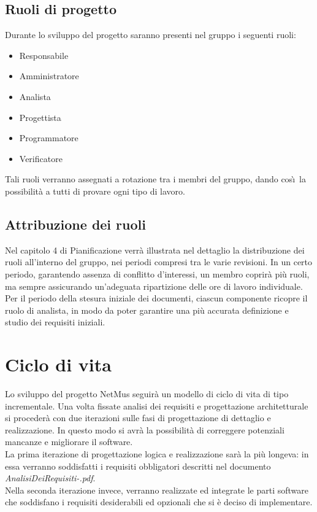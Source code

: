 \section{Ruoli di progetto}
Durante lo sviluppo del progetto saranno presenti nel gruppo i seguenti ruoli:
\begin{itemize}
  \item Responsabile
  \item Amministratore
  \item Analista
  \item Progettista
  \item Programmatore
  \item Verificatore
\end{itemize}

Tali ruoli verranno assegnati a rotazione tra i membri del gruppo, dando
cos\`\i\ la possibilit\`a a tutti di provare ogni tipo di lavoro.

\section{Attribuzione dei ruoli}
Nel capitolo 4 di Pianificazione verr\`a illustrata nel dettaglio la distribuzione dei ruoli
all'interno del gruppo, nei periodi compresi tra le varie revisioni.
In un certo periodo, garantendo assenza di conflitto d'interessi, un membro
coprir\`a pi\`u ruoli, ma sempre assicurando un'adeguata ripartizione delle ore
di lavoro individuale.\\

Per il periodo della stesura iniziale dei documenti, ciascun
componente ricopre il ruolo di analista, in modo da poter garantire una pi\`u
accurata definizione e studio dei requisiti iniziali.

\chapter{Ciclo di vita}
\thispagestyle{fancy}
Lo sviluppo del progetto NetMus seguir\`a un modello di ciclo di vita
di tipo incrementale. Una volta fissate analisi dei
requisiti e progettazione architetturale si proceder\`a con due iterazioni sulle fasi di
progettazione di dettaglio e realizzazione. In questo modo si avr\`a la
possibilit\`a di correggere potenziali mancanze e migliorare il
software.\\
La prima iterazione di progettazione logica e realizzazione sar\`a la pi\`u
longeva: in essa verranno soddisfatti i requisiti obbligatori descritti nel
documento \emph{AnalisiDeiRequisiti-\versioneAR.pdf}.\\
Nella seconda iterazione invece, verranno realizzate ed integrate le parti
software che soddisfano i requisiti desiderabili ed opzionali che si \`e deciso
di implementare.\\

